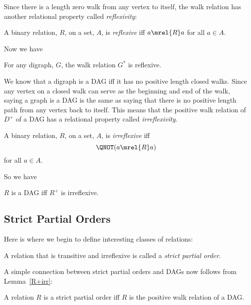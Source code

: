Since there is a length zero walk from any vertex to itself, the walk
relation has another relational property called \emph{reflexivity}:

\begin{definition}
A binary relation, $R$, on a set, $A$, is \emph{reflexive}%
iff $a \mrel{R} a$ for all $a \in A$.
\end{definition}
Now we have
\begin{lemma}
For any digraph, $G$, the walk relation $G^*$ is reflexive.
\end{lemma}

We know that a digraph is a DAG iff it has no positive length closed
walks.  Since any vertex on a closed walk can serve as the beginning
and end of the walk, saying a graph is a DAG is the same as saying
that there is no positive length path from any vertex back to itself.
\iffalse Lemma~\ref{shortestclosedwalk_lem} \fi This means that the
positive walk relation of $D^+$ of a DAG has a relational property
called \emph{irreflexivity}.

\begin{definition}
A binary relation, $R$, on a set, $A$, is
\emph{irreflexive} iff
\[
\QNOT(a \mrel{R} a)
\]
for all $a \in A$.
\end{definition}
So we have
\begin{lemma}\label{R+irr}
$R$ is a DAG iff $R^+$ is irreflexive.
\end{lemma}

\subsection{Strict Partial Orders}

Here is where we begin to define interesting classes of relations:

\begin{definition}%
A relation that is transitive and irreflexive is called a \emph{strict
  partial order}.
\end{definition}

A simple connection between strict partial orders and DAGs now follows
from Lemma~\ref{R+irr}:
\begin{theorem}\label{thm:SPOiffDAG}
A relation $R$ is a strict partial order iff $R$ is the positive walk
relation of a DAG.
\end{theorem}

